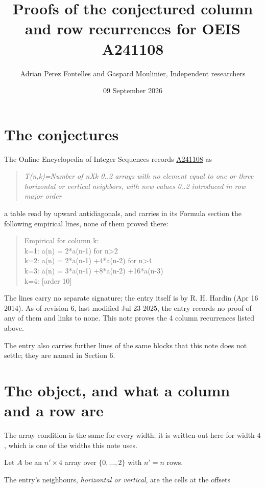 \documentclass[11pt]{article}
\title{Proofs of the conjectured column and row recurrences for OEIS A241108}
\author{Adrian Perez Fontelles and Gaspard Moulinier, Independent researchers}
\date{09 September 2026}
\theoremstyle{definition}
\begin{document}
\maketitle
\section{The conjectures}

The Online Encyclopedia of Integer Sequences records \href{https://oeis.org/A241108}{A241108} as

\begin{quote}\itshape T(n,k)=Number of nXk 0..2 arrays with no element equal to one or three horizontal or vertical neighbors, with new values 0..2 introduced in row major order\end{quote}

a table read by upward antidiagonals, and carries in its Formula section the following empirical lines, none of them proved there:

\begin{quote}\ttfamily Empirical for column k:\\
k=1: a(n) = 2*a(n-1) for n>2\\k=2: a(n) = 2*a(n-1) +4*a(n-2) for n>4\\k=3: a(n) = 3*a(n-1) +8*a(n-2) +16*a(n-3)\\k=4: [order 10]\end{quote}

The lines carry no separate signature; the entry itself is by R. H. Hardin (Apr 16 2014). As of revision 6, last modified Jul 23 2025, the entry records no proof of any of them and links to none. This note proves the 4 column recurrences listed above.

The entry also carries further lines of the same blocks that this note does not settle; they are named in Section 6.

\section{The object, and what a column and a row are}

The array condition is the same for every width; it is written out here for width $4$, which is one of the widths this note uses.

Let $A$ be an $n' \times 4$ array over $\{0,\dots,2\}$ with $n' = n$ rows.

The entry's neighbours, {\itshape horizontal or vertical}, are the cells at the offsets
\end{document}
